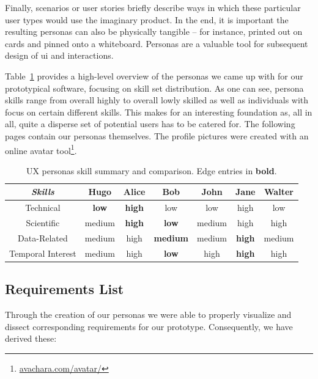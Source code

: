 Finally, scenarios or user stories briefly describe ways in which these particular user types would use the imaginary product.
In the end, it is important the resulting personas can also be physically tangible -- for instance, printed out on cards and pinned onto a whiteboard.
Personas are a valuable tool for subsequent design of \gls{ui} and interactions.

Table~\ref{tab:ux-personas} provides a high-level overview of the personas we came up with for our prototypical software, focusing on skill set distribution.
As one can see, persona skills range from overall highly to overall lowly skilled as well as individuals with focus on certain different skills.
This makes for an interesting foundation as, all in all, quite a disperse set of potential users has to be catered for. The following pages contain our personas themselves.
The profile pictures were created with an online avatar tool\footnote{\textcolor{blue}{\href{http://avachara.com/avatar/}{avachara.com/avatar/}}}.

\begin{table}
  \centering
  \begin{tabular}{ccccccc}
    \toprule
    \emph{Skills}      & Hugo             & Alice          & Bob              & John    & Jane           & Walter  \\
    \midrule
    Technical          & \textbf{low}  & \textbf{high}  & low              & low     & high           & low     \\
    Scientific         & medium        & \textbf{high}  & \textbf{low}     & medium  & high           & high    \\
    Data-Related       & medium        & high           & \textbf{medium}  & medium  & \textbf{high}  & medium  \\
    Temporal Interest  & medium        & high           & \textbf{low}     & high    & \textbf{high}  & high  \\
    \bottomrule
  \end{tabular}
  \caption{UX personas skill summary and comparison. Edge entries in \textbf{bold}.}
  \label{tab:ux-personas}
\end{table}

\subsection{Requirements List} \label{sec:requirements-list}

Through the creation of our personas we were able to properly visualize and dissect corresponding requirements for our prototype.
Consequently, we have derived these:

